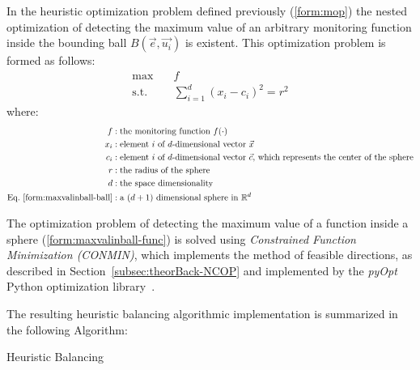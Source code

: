 In the heuristic optimization problem defined previously (\ref{form:mop}) the nested optimization of detecting the maximum value of an arbitrary monitoring function inside the bounding ball $B(\vec{e},\vec{u_i})$ is existent. This optimization problem is formed as follows:
\begin{align}
\max &\quad f \label{form:maxvalinball-func}\\
	\text{s.t.}&\quad \sum_{i=1}^d(x_i-c_i)^2=r^2 \label{form:maxvalinball-ball}
\end{align}
where:
\begin{align*}
f&: \text{the monitoring function $f(\cdot)$}\\
x_i&: \text{element $i$ of $d$-dimensional vector $\vec{x}$}\\
c_i&: \text{element $i$ of $d$-dimensional vector $\vec{c}$, which represents the center of the sphere}\\
r&: \text{the radius of the sphere}\\
d&: \text{the space dimensionality}\\
\text{Eq.~\ref{form:maxvalinball-ball}}&:\text{a $(d+1)$ dimensional sphere in $\mathbb{R}^d$}
\end{align*}

The optimization problem of detecting the maximum value of a function inside a sphere (\ref{form:maxvalinball-func}) is solved using \emph{Constrained Function Minimization (CONMIN)}, which implements the method of feasible directions, as described in Section~\ref{subsec:theorBack-NCOP} and implemented by the \emph{pyOpt} Python optimization library~\cite{pyOptCONMIN}.

The resulting heuristic balancing algorithmic implementation is summarized in the following Algorithm:\\
\begin{algorithm}[H]
\SetAlgoLined
{}


\caption{Heuristic Balancing \label{algo:heuristicbalancing}} 
\end{algorithm}

